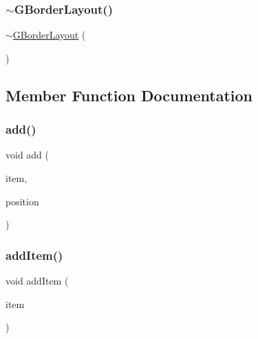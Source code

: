 \mbox{\label{classGBorderLayout_aecb2b1731ec37f3fab98ad836e31718e}} 
\subsubsection{\texorpdfstring{$\sim$\+G\+Border\+Layout()}{~GBorderLayout()}}
{\footnotesize\ttfamily $\sim$\mbox{\hyperlink{classGBorderLayout}{G\+Border\+Layout}} (\begin{DoxyParamCaption}{ }\end{DoxyParamCaption})\hspace{0.3cm}{\ttfamily [virtual]}}



\subsection{Member Function Documentation}
\mbox{\label{classGBorderLayout_a5652b7a28615910c334808a729dccda2}} 
\subsubsection{\texorpdfstring{add()}{add()}}
{\footnotesize\ttfamily void add (\begin{DoxyParamCaption}\item[{Q\+Layout\+Item $\ast$}]{item,  }\item[{\mbox{\hyperlink{classGLayout_ab91b34ae619fcdfcba4522b4f335bf83}{G\+Layout\+::\+Position}}}]{position }\end{DoxyParamCaption})}

\mbox{\label{classGBorderLayout_ac8fb6b47de0f28c7916b8987efa7a1b0}} 
\subsubsection{\texorpdfstring{add\+Item()}{addItem()}}
{\footnotesize\ttfamily void add\+Item (\begin{DoxyParamCaption}\item[{Q\+Layout\+Item $\ast$}]{item }\end{DoxyParamCaption})}

